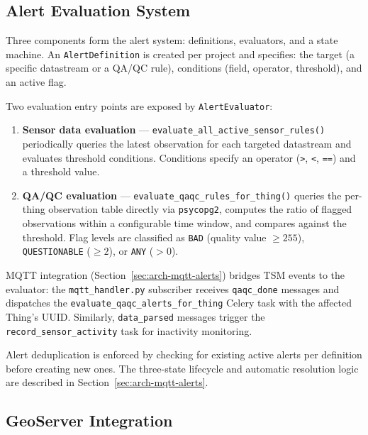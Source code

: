 \subsection{Alert Evaluation System}
\label{sec:impl-backend-alerts}

Three components form the alert system: definitions, evaluators, and a state machine. An
\texttt{AlertDefinition} is created per project and specifies: the target (a specific
datastream or a QA/QC rule), conditions (field, operator, threshold), and an active flag.

Two evaluation entry points are exposed by \texttt{AlertEvaluator}:

\begin{enumerate}
  \item \textbf{Sensor data evaluation} --- \texttt{evaluate\_all\_active\_sensor\_rules()}
        periodically queries the latest observation for each targeted datastream and
        evaluates threshold conditions. Conditions specify an operator (\texttt{>},
        \texttt{<}, \texttt{==}) and a threshold value.
  \item \textbf{QA/QC evaluation} --- \texttt{evaluate\_qaqc\_rules\_for\_thing()} queries
        the per-thing observation table directly via \texttt{psycopg2}, computes the ratio
        of flagged observations within a configurable time window, and compares against
        the threshold. Flag levels are classified as \texttt{BAD} (quality value $\geq 255$),
        \texttt{QUESTIONABLE} ($\geq 2$), or \texttt{ANY} ($> 0$).
\end{enumerate}

MQTT integration (Section~\ref{sec:arch-mqtt-alerts}) bridges TSM events to the
evaluator: the \texttt{mqtt\_handler.py} subscriber receives \texttt{qaqc\_done} messages
and dispatches the \texttt{evaluate\_qaqc\_alerts\_for\_thing} Celery task with the
affected Thing's UUID. Similarly, \texttt{data\_parsed} messages trigger the
\texttt{record\_sensor\_activity} task for inactivity monitoring.

Alert deduplication is enforced by checking for existing active alerts per definition before
creating new ones. The three-state lifecycle and automatic resolution logic are described
in Section~\ref{sec:arch-mqtt-alerts}.

\subsection{GeoServer Integration}
\label{sec:impl-backend-geoserver}

